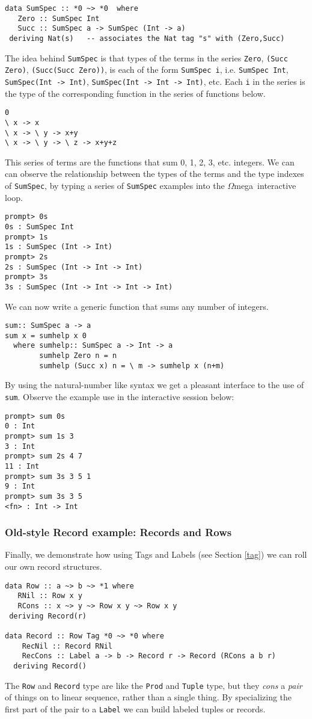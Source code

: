 \documentclass[11pt,twoside]{article}
\newcommand{\om}{$\Omega$mega}
\begin{document}
\begin{verbatim}
data SumSpec :: *0 ~> *0  where
   Zero :: SumSpec Int 
   Succ :: SumSpec a -> SumSpec (Int -> a)
 deriving Nat(s)   -- associates the Nat tag "s" with (Zero,Succ)
\end{verbatim} 
The idea behind {\tt SumSpec} is that types of the
terms in the series {\tt Zero},
{\tt (Succ Zero)}, {\tt (Succ(Succ Zero))}, is each
of the form {\tt SumSpec i}, i.e. {\tt SumSpec Int}, {\tt SumSpec(Int -> Int)},
{\tt SumSpec(Int -> Int -> Int)}, etc. Each {\tt i} in the series
is the type of the corresponding function in the series of functions below.
\begin{verbatim}
0
\ x -> x
\ x -> \ y -> x+y
\ x -> \ y -> \ z -> x+y+z
\end{verbatim}
This series of terms are the functions that sum 0, 1, 2, 3, etc. integers.
We can can observe the relationship between the types of the terms and
the type indexes of {\tt SumSpec}, by typing a series of {\tt SumSpec} examples into the \om\ interactive loop.
\begin{verbatim}
prompt> 0s
0s : SumSpec Int
prompt> 1s
1s : SumSpec (Int -> Int)
prompt> 2s
2s : SumSpec (Int -> Int -> Int)
prompt> 3s
3s : SumSpec (Int -> Int -> Int -> Int)
\end{verbatim}
We can now write a generic function that sums any number of integers.

\begin{verbatim}
sum:: SumSpec a -> a
sum x = sumhelp x 0
  where sumhelp:: SumSpec a -> Int -> a
        sumhelp Zero n = n
        sumhelp (Succ x) n = \ m -> sumhelp x (n+m)
\end{verbatim}        
By using the natural-number like syntax we get a pleasant interface to
the use of {\tt sum}. Observe the example use in the interactive session
below:
\begin{verbatim}
prompt> sum 0s
0 : Int
prompt> sum 1s 3
3 : Int
prompt> sum 2s 4 7
11 : Int
prompt> sum 3s 3 5 1
9 : Int
prompt> sum 3s 3 5
<fn> : Int -> Int
\end{verbatim}

\subsubsection{Old-style Record example: Records and Rows}
Finally, we demonstrate how using Tags and Labels (see Section \ref{tag})
we can roll our own record structures. 

\begin{verbatim}
data Row :: a ~> b ~> *1 where
   RNil :: Row x y
   RCons :: x ~> y ~> Row x y ~> Row x y
 deriving Record(r)

data Record :: Row Tag *0 ~> *0 where
    RecNil :: Record RNil
    RecCons :: Label a -> b -> Record r -> Record (RCons a b r)
  deriving Record()
\end{verbatim} 
The {\tt Row} and {\tt Record} type are like the {\tt Prod} and
{\tt Tuple} type, but they {\it cons} a {\it pair} of things on to
linear sequence, rather than a single thing. By specializing
the first part of the pair to a {\tt Label} we can build labeled
tuples or records.
\end{document}
